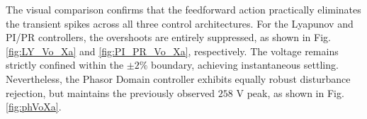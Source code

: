 \documentclass[DIV=calc, paper=a4, fontsize=11pt, twocolumn]{scrartcl}	 %
\newcommand\topmidheader[2]{\multicolumn{#1}{c}{\textsc{#2}}\\%
        \addlinespace[0.5ex]}
\begin{document}
The visual comparison confirms that the feedforward action practically eliminates the transient spikes across all three control architectures. For the Lyapunov and PI/PR controllers, the overshoots are entirely suppressed, as shown in Fig. \ref{fig:LY_Vo_Xa} and \ref{fig:PI_PR_Vo_Xa}, respectively. The voltage remains strictly confined within the $\pm 2\%$ boundary, achieving instantaneous settling. Nevertheless, the Phasor Domain controller exhibits equally robust disturbance rejection, but maintains the previously observed $258\text{ V}$ peak, as shown in Fig. \ref{fig:phVoXa}. 







\end{document}

